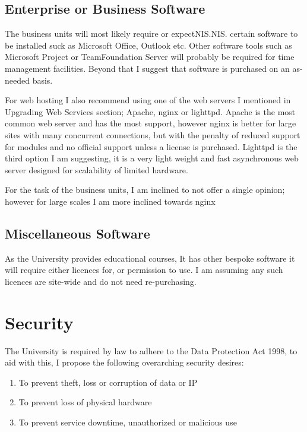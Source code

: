 \documentclass[10pt]{article}
\begin{document}
        \subsection{Enterprise or Business Software}
            The business units will most likely require or expectNIS.NIS. certain software to be installed suck as Microsoft Office, Outlook etc. Other software tools such as Microsoft Project or TeamFoundation Server will probably be required for time management facilities. Beyond that I suggest that software is purchased on an as-needed basis. 

            For web hosting I also recommend using one of the web servers I mentioned in Upgrading Web Services section; Apache, nginx or lighttpd. Apache is the most common web server and has the most support, however nginx is better for large sites with many concurrent connections, but with the penalty of reduced support for modules and no official support unless a license is purchased. Lighttpd is the third option I am suggesting, it is a very light weight and fast asynchronous web server designed for scalability of limited hardware\cite{cite:lighttpdWiki}.

            For the task of the business units, I am inclined to not offer a single opinion; however for large scales I am more inclined towards nginx

        \subsection{Miscellaneous Software}
            As the University provides educational courses, It has other bespoke software it will require either licences for, or permission to use. I am assuming any such licences are site-wide and do not need re-purchasing. 

    \section{Security}
        The University is required by law to adhere to the Data Protection Act 1998\cite{cite:dataProtectionAct}, to aid with this, I propose the following overarching security desires:

        \begin{enumerate}
            \item To prevent theft, loss or corruption of data or IP
            \item To prevent loss of physical hardware
            \item To prevent service downtime, unauthorized or malicious use
        \end{enumerate}
\end{document}

